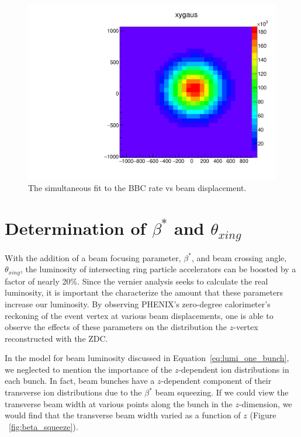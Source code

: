 \begin{figure}
  \centering
  \includegraphics[width=0.8\linewidth]{./figures/beam_width_359711.pdf}
  \caption{
    The simultaneous fit to the BBC rate vs beam displacement.
  }
  \label{fig:width_true}
\end{figure}

\section{Determination of $\beta^*$ and $\theta_{xing}$}
\label{sec:hourglass_correction}

With the addition of a beam focusing parameter, $\beta^*$, and beam crossing
angle, $\theta_{xing}$, the luminosity of intersecting ring particle
accelerators can be boosted by a factor of nearly 20\%. Since the vernier
analysis seeks to calculate the real luminosity, it is important the
characterize the amount that these parameters increase our luminosity. By
observing PHENIX's zero-degree calorimeter's reckoning of the event vertex at
various beam displacements, one is able to observe the effects of these
parameters on the distribution the $z$-vertex reconstructed with the ZDC.

In the model for beam luminosity discussed in Equation~\ref{eq:lumi_one_bunch},
we neglected to  mention the importance of the $z$-dependent ion distributions
in each bunch. In fact, beam bunches have a $z$-dependent component of their
transverse ion distributions due to the $\beta^*$ beam squeezing. If we could
view the transverse beam width at various points along the bunch in the
$z$-dimension, we would find that the transverse beam width varied as a function
of $z$ (Figure ~\ref{fig:beta_squeeze}).

